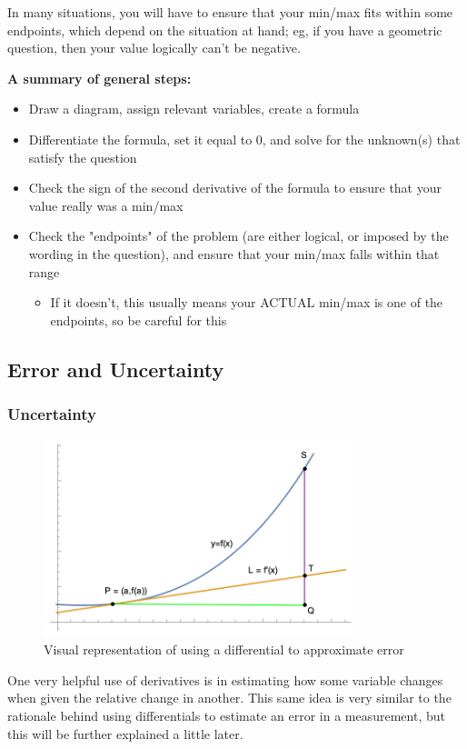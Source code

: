 \documentclass[12pt]{article}
\begin{document}
In many situations, you will have to ensure that your min/max fits within some endpoints, which depend on the situation at hand; eg, if you have a geometric question, then your value logically can't be negative. 

\textbf{A summary of general steps:}
\begin{itemize}
    \item Draw a diagram, assign relevant variables, create a formula
    \item Differentiate the formula, set it equal to 0, and solve for the unknown(s) that satisfy the question
    \item Check the sign of the second derivative of the formula to ensure that your value really was a min/max
    \item Check the "endpoints" of the problem (are either logical, or imposed by the wording in the question), and ensure that your min/max falls within that range
    \begin{itemize}
        \item If it doesn't, this usually means your ACTUAL min/max is one of the endpoints, so be careful for this
    \end{itemize}
\end{itemize}
\subsection{Error and Uncertainty}
\subsubsection{Uncertainty}
\begin{figure}[!ht]
    \centering
    \includegraphics[width=9cm]{misc/differentialserrors.png}
    \caption{Visual representation of using a differential to approximate error}
    \label{fig:dxtoapproxerrors}
\end{figure}

One very helpful use of derivatives is in estimating how some variable changes when given the relative change in another. This same idea is very similar to the rationale behind using differentials to estimate an error in a measurement, but this will be further explained a little later.
\end{document}
